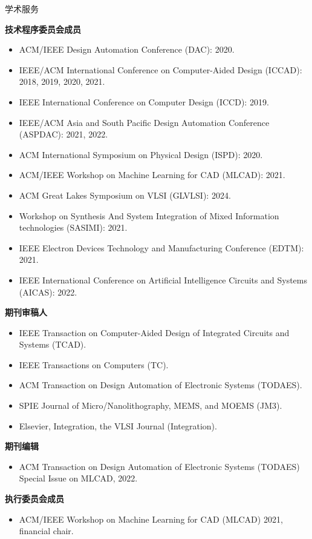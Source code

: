 
\begin{rSection}{学术服务}

\textbf{技术程序委员会成员}
\begin{itemize}
    \item ACM/IEEE Design Automation Conference (DAC): 2020.
    \item IEEE/ACM International Conference on Computer-Aided Design (ICCAD): 2018, 2019, 2020, 2021.
    \item IEEE International Conference on Computer Design (ICCD): 2019.
    \item IEEE/ACM Asia and South Pacific Design Automation Conference (ASPDAC): 2021, 2022.
    \item ACM International Symposium on Physical Design (ISPD): 2020.
    \item ACM/IEEE Workshop on Machine Learning for CAD (MLCAD): 2021.
    \item ACM Great Lakes Symposium on VLSI (GLVLSI): 2024.
    \item Workshop on Synthesis And System Integration of Mixed Information technologies (SASIMI): 2021.
    \item IEEE Electron Devices Technology and Manufacturing Conference (EDTM): 2021.
    \item IEEE International Conference on Artificial Intelligence Circuits and Systems (AICAS): 2022. 
\end{itemize}

\textbf{期刊审稿人}
\begin{itemize}
    \item IEEE Transaction on Computer-Aided Design of Integrated Circuits and Systems (TCAD).
    \item IEEE Transactions on Computers (TC).
    \item ACM Transaction on Design Automation of Electronic Systems (TODAES).
    \item SPIE Journal of Micro/Nanolithography, MEMS, and MOEMS (JM3).
    \item Elsevier, Integration, the VLSI Journal (Integration).
\end{itemize}

\textbf{期刊编辑}
\begin{itemize}
    \item ACM Transaction on Design Automation of Electronic Systems (TODAES) Special Issue on MLCAD, 2022.
\end{itemize}

\textbf{执行委员会成员}
\begin{itemize}
    \item ACM/IEEE Workshop on Machine Learning for CAD (MLCAD) 2021, financial chair.
\end{itemize}

\end{rSection}


